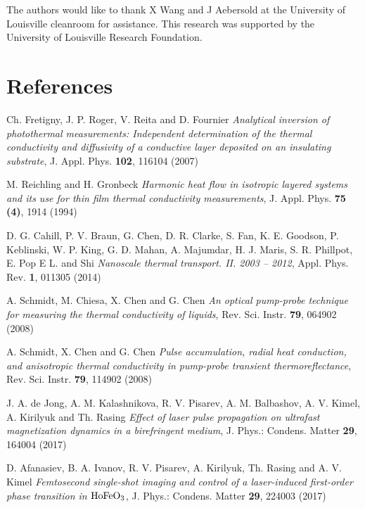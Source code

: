 \documentclass[5p]{elsarticle}
\begin{document}
The authors would like to thank X Wang and J Aebersold at the University of Louisville cleanroom for assistance. This research was supported by the University of Louisville Research Foundation.

\section*{References}

\begin{thebibliography}{}

Ch. Fretigny, J. P. Roger, V. Reita and D. Fournier \emph{Analytical inversion of photothermal measurements: Independent determination of the thermal conductivity and diffusivity of a conductive layer deposited on an insulating substrate}, J. Appl. Phys. \textbf{102}, 116104 (2007)

M. Reichling and H. Gronbeck \emph{Harmonic heat flow in isotropic layered systems and its use for thin film thermal conductivity measurements}, J. Appl. Phys. \textbf{75 (4)}, 1914 (1994)

D. G. Cahill, P. V. Braun, G. Chen, D. R. Clarke, S. Fan, K. E. Goodson, P. Keblinski, W. P. King, G. D. Mahan, A. Majumdar, H. J. Maris, S. R. Phillpot, E. Pop E L. and Shi \emph{Nanoscale thermal transport. II. 2003 -- 2012}, Appl. Phys. Rev. \textbf{1}, 011305 (2014)

A. Schmidt, M. Chiesa, X. Chen and G. Chen \emph{An optical pump-probe technique for measuring the thermal conductivity of liquids}, Rev. Sci. Instr. \textbf{79}, 064902 (2008)

A. Schmidt, X. Chen and G. Chen \emph{Pulse accumulation, radial heat conduction, and anisotropic thermal conductivity in pump-probe transient thermoreflectance}, Rev. Sci. Instr. \textbf{79}, 114902 (2008)

J. A. de Jong, A. M. Kalashnikova, R. V. Pisarev, A. M. Balbashov, A. V. Kimel, A. Kirilyuk and Th. Rasing \emph{Effect of laser pulse propagation on ultrafast magnetization dynamics in a birefringent medium}, J. Phys.: Condens. Matter \textbf{29}, 164004 (2017)

D. Afanasiev, B. A. Ivanov, R. V. Pisarev, A. Kirilyuk, Th. Rasing and A. V. Kimel \emph{Femtosecond single-shot imaging and control of a laser-induced first-order phase transition in $\rm HoFeO_3$}, J. Phys.: Condens. Matter \textbf{29}, 224003 (2017)


\end{thebibliography}
\end{document}
